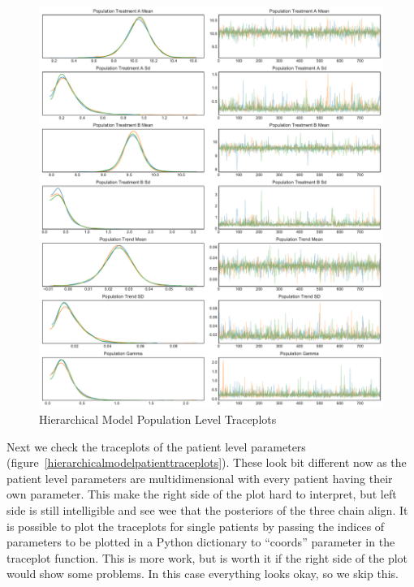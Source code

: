 \documentclass[12pt,a4paper,leqno]{report}
\theoremstyle{plain}
\theoremstyle{definition}
\theoremstyle{remark}
\begin{document}
\bigskip
\begin{figure}[H]
    \caption{Hierarchical Model Population Level Traceplots}
    \label{hierarchicalmodelpopulationtraceplots}
    \bigskip
    \includegraphics[width=\textwidth,height=\textheight,keepaspectratio]{hierarchical_model_population_level_traceplot.pdf}
\end{figure}
\bigskip


Next we check the traceplots of the patient level parameters (figure\
\ref{hierarchicalmodelpatienttraceplots}). These look bit different now as the patient
level parameters are multidimensional with every patient having their own
parameter. This make the right side of the plot hard to interpret, but left side is
still intelligible and see wee that the posteriors of the three chain align. It is
possible to plot the traceplots for single patients by passing the indices of parameters
to be plotted in a Python dictionary to ``coords'' parameter in the traceplot function.
This is more work, but is worth it if the right side of the plot would show some
problems. In this case everything looks okay, so we skip this.
\end{document}
